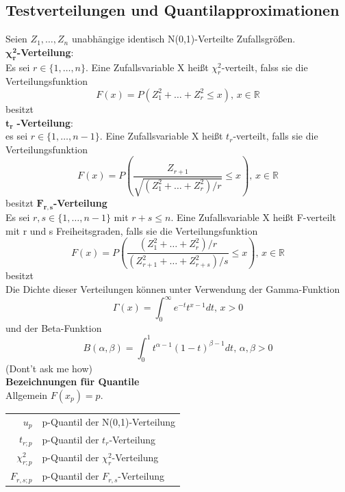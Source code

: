 \documentclass[
	ngerman,
	accentcolor=9c,%
	type=intern,
	marginpar=false
	]{tudapub}
\begin{document}
        \subsection{Testverteilungen und Quantilapproximationen}
        Seien $Z_1,\dots,Z_n$ unabhängige identisch N(0,1)-Verteilte Zufallsgrößen.\\[2ex]
        $\mathbf{\chi_r^2}$\textbf{-Verteilung}:\\
        Es sei $r\in\{1,\dots,n\}$. Eine Zufallsvariable X heißt $\chi_r^2$-verteilt, falss sie die Verteilungsfunktion 
        \begin{equation*}
            F(x) = P(Z_1^2+\dots+Z_r^2 \leq x)\mbox{, } x\in \mathbb{R}
        \end{equation*}
        besitzt\\[2ex]
       $\mathbf{t_r}$ \textbf{-Verteilung}:\\
        es sei $r \in \{1,\dots,n-1\}$. Eine Zufallsvariable X heißt $t_r$-verteilt, falls sie die Verteilungsfunktion
        \begin{equation*}
            F(x) = P \left(
                \dfrac{Z_{r+1}}{\sqrt{(Z_1^2+\dots+Z_r^2)/r}} \leq x
            \right) \mbox{, } x \in \mathbb{R}
        \end{equation*}
        besitzt\newpage
        $\mathbf{F_{r,s}}$\textbf{-Verteilung}\\
        Es sei $r,s \in \{1,\dots,n-1\}$ mit $r+s\leq n$. 
        Eine Zufallsvariable X heißt F-verteilt mit r und s Freiheitsgraden, falls sie die Verteilungsfunktion
        \begin{equation*}
            F(x) = P\left(
                \dfrac{(Z_1^2+\dots+Z_r^2)/r}{(Z_{r+1}^2+ \dots + Z_{r+s}^2)/s} \leq x
            \right)\mbox{, }x \in \mathbb{R}
        \end{equation*} besitzt\\

        Die Dichte dieser Verteilungen können unter Verwendung der Gamma-Funktion
        \begin{equation*}
            \Gamma(x)=\int_0^\infty e^{-t}t^{x-1}dt\mbox{, }x>0
        \end{equation*}
        und der Beta-Funktion
        \begin{equation*}
            B(\alpha, \beta)= \int_0^1 t^{\alpha-1}(1-t)^{\beta-1}dt \mbox{, }\alpha, \beta > 0
        \end{equation*}
        (Dont't ask me how)\\[2ex]
        \textbf{Bezeichnungen für Quantile}\\
        Allgemein $F(x_p)=p$.
        \begin{center}
            \begin{tabular}{r l}
                $u_p$ & p-Quantil der N(0,1)-Verteilung\\
                $t_{r;p}$ & p-Quantil der $t_r$-Verteilung\\
                $\chi^2_{r;p}$ & p-Quantil der $\chi_r^2$-Verteilung\\
                $F_{r,s;p}$ & p-Quantil der $F_{r,s}$-Verteilung\\
            \end{tabular}
        \end{center}
\end{document}
